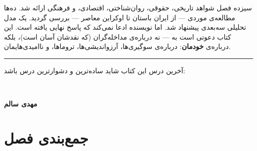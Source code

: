 سیزده فصل شواهد تاریخی، حقوقی، روان‌شناختی، اقتصادی، و فرهنگی ارائه شد. ده‌ها مطالعه‌ی موردی — از ایران باستان تا اوکراین معاصر — بررسی گردید. یک مدل تحلیلی سه‌بعدی پیشنهاد شد. اما نویسنده ادعا نمی‌کند که پاسخ نهایی یافته است. این کتاب دعوتی است به  — نه درباره‌ی مداخله‌گران (که نقدشان آسان است)، بلکه درباره‌ی \textbf{خودمان}: درباره‌ی سوگیری‌ها، آرزواندیشی‌ها، تروماها، و ناامیدی‌هایمان.

\begin{center}
\rule{0.4\linewidth}{0.4pt}
\end{center}

آخرین درس این کتاب شاید ساده‌ترین و دشوارترین درس باشد:

\begin{center}
\textbf{\large {}}\\[4pt]
\textbf{\large {}}
\end{center}

\vspace{0.5cm}

\begin{flushright}
\textbf{مهدی سالم}\\
\end{flushright}


\section{جمع‌بندی فصل}
\label{sec:ch14-conclusion}


